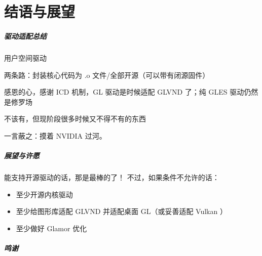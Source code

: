 \documentclass{ctexbeamer}
\begin{document}
\part{结语与展望}
\frame{\partpage}

\begin{frame}
    \frametitle{驱动适配总结}
    \begin{labeling}{用户空间驱动}
        \item [内核驱动] 两条路：封装核心代码为 .o 文件/全部开源（可以带有闭源固件）
        \item [用户空间驱动] 感恩的心，感谢 ICD 机制，GL 驱动是时候适配 GLVND 了；纯 GLES 驱动仍然是修罗场
        \item [DDX] 不该有，但现阶段很多时候又不得不有的东西
    \end{labeling}
    \hfill \break
    一言蔽之：摸着 NVIDIA 过河。
\end{frame}

\begin{frame}
    \frametitle{展望与许愿}
    能支持开源驱动的话，那是最棒的了！
    不过，如果条件不允许的话：
    \begin{itemize}
        \item 至少开源内核驱动
        \item 至少给图形库适配 GLVND 并适配桌面 GL（或妥善适配 Vulkan ）
        \item 至少做好 Glamor 优化
    \end{itemize}
\end{frame}

\begin{frame}
    \frametitle{鸣谢}
\end{frame}
\end{document}
